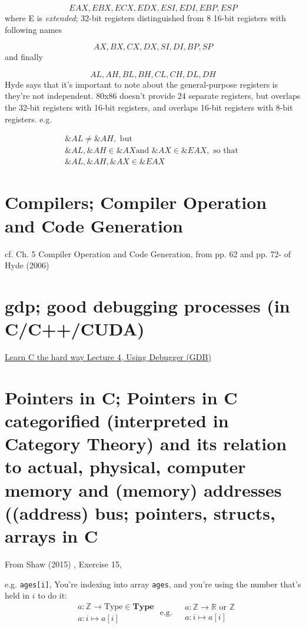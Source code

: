 \documentclass[10pt]{amsart}
\begin{document}
\begin{multicols*}{2}
\[
EAX, EBX, ECX, EDX, ESI, EDI, EBP, ESP
\]
where E is \emph{extended}; 32-bit registers distinguished from 8 16-bit registers with following names 

\[
AX, BX, CX, DX, SI, DI, BP, SP
\]
and finally 

\[
AL, AH, BL, BH, CL, CH, DL, DH
\]
Hyde says that it's important to note about the general-purpose registers is they're not independent.  80x86 doesn't provide 24 separate registers, but overlaps the 32-bit registers with 16-bit registers, and overlaps 16-bit registers with 8-bit registers.  e.g.

\[
\begin{gathered}
\&AL \neq \&AH, \text{ but } \\
\&AL, \&AH \in \&AX \text{and } \&AX \in \&EAX, \text{ so that } \\
\&AL , \&AH, \&AX \in \&EAX
\end{gathered}
\]

\section{Compilers; Compiler Operation and Code Generation}

cf. Ch. 5 Compiler Operation and Code Generation, from pp. 62 and pp. 72- of Hyde (2006) \cite{Hyde2006}


\section{gdp; good debugging processes (in C/C++/CUDA)}

\href{https://youtu.be/heEaKf2b1uA}{Learn C the hard way Lecture 4, Using Debugger (GDB) }


\section{Pointers in C; Pointers in C categorified (interpreted in Category Theory) and its relation to actual, physical, computer memory and (memory) addresses ((address) bus; pointers, structs, arrays in C}

From Shaw (2015) \cite{Shaw2015}, Exercise 15, 

e.g. \verb|ages[i]|, You're indexing into array \verb|ages|, and you're using the number that's held in $i$ to do it:  
\[
\begin{aligned}
& a : \mathbb{Z} \to \text{Type} \in \textbf{Type}  \\
& a: i \mapsto a[i]
\end{aligned} \text{ e.g. } 
\begin{aligned}
& a: \mathbb{Z} \to \mathbb{R} \text{ or } \mathbb{Z}  \\
& a:i \mapsto a[i]
\end{aligned}
\]


\end{multicols*}
\end{document}
